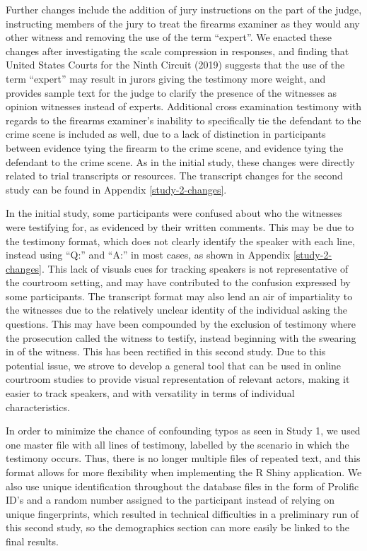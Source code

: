 \documentclass[print]{nuthesis}
\begin{document}
Further changes include the addition of jury instructions on the part of the judge, instructing members of the jury to treat the firearms examiner as they would any other witness and removing the use of the term ``expert''.
We enacted these changes after investigating the scale compression in responses, and finding that United States Courts for the Ninth Circuit (2019) suggests that the use of the term ``expert'' may result in jurors giving the testimony more weight, and provides sample text for the judge to clarify the presence of the witnesses as opinion witnesses instead of experts.
Additional cross examination testimony with regards to the firearms examiner's inability to specifically tie the defendant to the crime scene is included as well, due to a lack of distinction in participants between evidence tying the firearm to the crime scene, and evidence tying the defendant to the crime scene.
As in the initial study, these changes were directly related to trial transcripts or resources.
The transcript changes for the second study can be found in Appendix \ref{study-2-changes}.

In the initial study, some participants were confused about who the witnesses were testifying for, as evidenced by their written comments.
This may be due to the testimony format, which does not clearly identify the speaker with each line, instead using ``Q:'' and ``A:'' in most cases, as shown in Appendix \ref{study-2-changes}.
This lack of visuals cues for tracking speakers is not representative of the courtroom setting, and may have contributed to the confusion expressed by some participants.
The transcript format may also lend an air of impartiality to the witnesses due to the relatively unclear identity of the individual asking the questions.
This may have been compounded by the exclusion of testimony where the prosecution called the witness to testify, instead beginning with the swearing in of the witness.
This has been rectified in this second study.
Due to this potential issue, we strove to develop a general tool that can be used in online courtroom studies to provide visual representation of relevant actors, making it easier to track speakers, and with versatility in terms of individual characteristics.

In order to minimize the chance of confounding typos as seen in Study 1, we used one master file with all lines of testimony, labelled by the scenario in which the testimony occurs.
Thus, there is no longer multiple files of repeated text, and this format allows for more flexibility when implementing the R Shiny application.
We also use unique identification throughout the database files in the form of Prolific ID's and a random number assigned to the participant instead of relying on unique fingerprints, which resulted in technical difficulties in a preliminary run of this second study, so the demographics section can more easily be linked to the final results.
\end{document}
